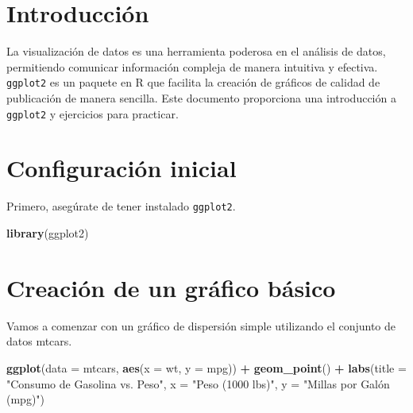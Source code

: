 \documentclass[
]{book}
\newenvironment{Shaded}{\begin{snugshade}}{\end{snugshade}}
\newcommand{\AttributeTok}[1]{\textcolor[rgb]{0.13,0.29,0.53}{#1}}
\newcommand{\FunctionTok}[1]{\textcolor[rgb]{0.13,0.29,0.53}{\textbf{#1}}}
\newcommand{\NormalTok}[1]{#1}
\newcommand{\SpecialCharTok}[1]{\textcolor[rgb]{0.81,0.36,0.00}{\textbf{#1}}}
\newcommand{\StringTok}[1]{\textcolor[rgb]{0.31,0.60,0.02}{#1}}
\begin{document}
\hypertarget{introducciuxf3n-1}{%
\section{Introducción}\label{introducciuxf3n-1}}

La visualización de datos es una herramienta poderosa en el análisis de datos, permitiendo comunicar información compleja de manera intuitiva y efectiva. \texttt{ggplot2} es un paquete en R que facilita la creación de gráficos de calidad de publicación de manera sencilla. Este documento proporciona una introducción a \texttt{ggplot2} y ejercicios para practicar.

\hypertarget{configuraciuxf3n-inicial-1}{%
\section{Configuración inicial}\label{configuraciuxf3n-inicial-1}}

Primero, asegúrate de tener instalado \texttt{ggplot2}.

\begin{Shaded}
\begin{Highlighting}[]
\FunctionTok{library}\NormalTok{(ggplot2)}
\end{Highlighting}
\end{Shaded}

\hypertarget{creaciuxf3n-de-un-gruxe1fico-buxe1sico-1}{%
\section{Creación de un gráfico básico}\label{creaciuxf3n-de-un-gruxe1fico-buxe1sico-1}}

Vamos a comenzar con un gráfico de dispersión simple utilizando el conjunto de datos mtcars.

\begin{Shaded}
\begin{Highlighting}[]
\FunctionTok{ggplot}\NormalTok{(}\AttributeTok{data =}\NormalTok{ mtcars, }\FunctionTok{aes}\NormalTok{(}\AttributeTok{x =}\NormalTok{ wt, }\AttributeTok{y =}\NormalTok{ mpg)) }\SpecialCharTok{+} 
  \FunctionTok{geom\_point}\NormalTok{() }\SpecialCharTok{+}
  \FunctionTok{labs}\NormalTok{(}\AttributeTok{title =} \StringTok{"Consumo de Gasolina vs. Peso"}\NormalTok{,}
       \AttributeTok{x =} \StringTok{"Peso (1000 lbs)"}\NormalTok{,}
       \AttributeTok{y =} \StringTok{"Millas por Galón (mpg)"}\NormalTok{)}
\end{Highlighting}
\end{Shaded}
\end{document}
